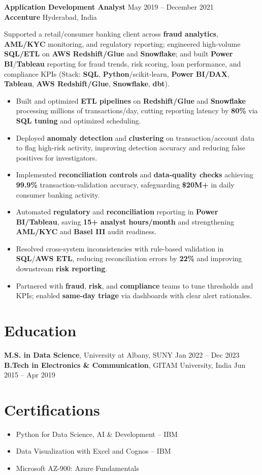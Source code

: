 \documentclass[9.5pt]{article}
\begin{document}
\textbf{Application Development Analyst} \hfill May 2019 -- December 2021\\
\textbf{Accenture} \hfill Hyderabad, India

Supported a retail/consumer banking client across \textbf{fraud analytics}, \textbf{AML/KYC} monitoring, and regulatory reporting; engineered high-volume \textbf{SQL/ETL} on \textbf{AWS Redshift/Glue} and \textbf{Snowflake}; and built \textbf{Power BI}/\textbf{Tableau} reporting for fraud trends, risk scoring, loan performance, and compliance KPIs (Stack: \textbf{SQL}, \textbf{Python}/scikit-learn, \textbf{Power BI/DAX}, \textbf{Tableau}, \textbf{AWS Redshift/Glue}, \textbf{Snowflake}, \textbf{dbt}).

\begin{itemize}\setlength\itemsep{0.25em}
  \item Built and optimized \textbf{ETL pipelines} on \textbf{Redshift/Glue} and \textbf{Snowflake} processing millions of transactions/day, cutting reporting latency by \textbf{80\%} via \textbf{SQL tuning} and optimized scheduling.
  \item Deployed \textbf{anomaly detection} and \textbf{clustering} on transaction/account data to flag high-risk activity, improving detection accuracy and reducing false positives for investigators.
  \item Implemented \textbf{reconciliation controls} and \textbf{data-quality checks} achieving \textbf{99.9\%} transaction-validation accuracy, safeguarding \textbf{\$20M+} in daily consumer banking activity.
  \item Automated \textbf{regulatory} and \textbf{reconciliation} reporting in \textbf{Power BI/Tableau}, saving \textbf{15+ analyst hours/month} and strengthening \textbf{AML/KYC} and \textbf{Basel III} audit readiness.
  \item Resolved cross-system inconsistencies with rule-based validation in \textbf{SQL}/\textbf{AWS ETL}, reducing reconciliation errors by \textbf{22\%} and improving downstream \textbf{risk reporting}.
  \item Partnered with \textbf{fraud}, \textbf{risk}, and \textbf{compliance} teams to tune thresholds and KPIs; enabled \textbf{same-day triage} via dashboards with clear alert rationales.
\end{itemize}


\section*{Education}
\textbf{M.S. in Data Science}, University at Albany, SUNY \hfill {Jan 2022 -- Dec 2023} \\
\textbf{B.Tech in Electronics \& Communication}, GITAM University, India \hfill {Jun 2015 -- Apr 2019}

\section*{Certifications}
\begin{itemize}[leftmargin=*]
  \item Python for Data Science, AI \& Development -- IBM
  \item Data Visualization with Excel and Cognos -- IBM
  \item Microsoft AZ-900: Azure Fundamentals
\end{itemize}
\end{document}
